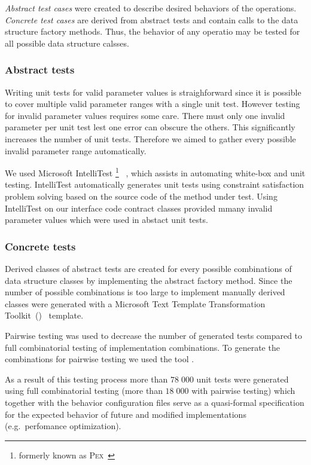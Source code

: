 \emph{Abstract test cases} were created to describe desired behaviors
of the operations. \emph{Concrete test cases} are derived from
abstract tests and contain calls to the data structure factory
methods. Thus, the behavior of any operatio may be tested for all
possible data structure calsses.

\subsubsection{Abstract tests}

Writing unit tests for valid parameter values is straighforward since
it is possible to cover multiple valid parameter ranges with a single
unit test. However testing for invalid parameter values requires some
care. There must only one invalid parameter per unit test lest one
error can obscure the others. This significantly increases the number
of unit tests. Therefore we aimed to gather every possible invalid
parameter range automatically.

We used Microsoft IntelliTest%
\footnote{formerly known as \textsc{Pex}~\citep{tillmann2008pex}}%
~\citep{IntelliTest}, which assists in automating white-box and unit
testing. IntelliTest automatically generates unit tests using
constraint satisfaction problem solving based on the source code of
the method under test. Using IntelliTest on our interface code
contract classes provided mmany invalid parameter values which were
used in abstact unit tests.

\subsubsection{Concrete tests}

Derived classes of abstract tests are created for every possible
combinations of data structure classes by implementing the abstract
factory method. Since the number of possible combinations is too large
to implement manually derived classes were generated with a Microsoft
Text Template Transformation Toolkit~()~\citep{T4}
template.

Pairwise testing was used to decrease the number of generated tests
compared to full combinatorial testing of implementation
combinations. To generate the combinations for pairwise testing we
used the  tool \citep{borazjany2012combinatorial}.

As a result of this testing process more than $78\;000$ unit tests
were generated using full combinatorial testing (more than $18\;000$
with pairwise testing) which together with the behavior configuration
files serve as a quasi-formal specification for the expected behavior
of future and modified implementations (e.g.~perfomance
optimization).

